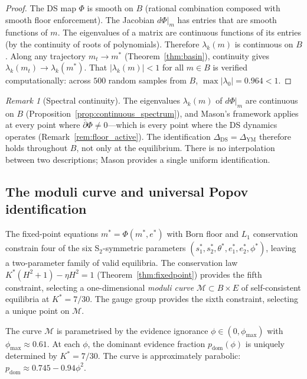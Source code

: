 \documentclass[11pt,a4paper]{article}
\theoremstyle{definition}
\theoremstyle{remark}
\newtheorem{remark}[theorem]{Remark}
\newcommand{\dbar}{\bar{\partial}}
\begin{document}
\begin{proof}
The DS map $\Phi$ is smooth on $B$ (rational combination composed with smooth floor enforcement). The Jacobian $d\Phi|_m$ has entries that are smooth functions of $m$. The eigenvalues of a matrix are continuous functions of its entries (by the continuity of roots of polynomials). Therefore $\lambda_k(m)$ is continuous on $B$. Along any trajectory $m_t\to m^*$ (Theorem~\ref{thm:basin}), continuity gives $\lambda_k(m_t)\to\lambda_k(m^*)$. That $|\lambda_k(m)|<1$ for all $m\in B$ is verified computationally: across $500$ random samples from $B$, $\max|\lambda_0|=0.964<1$.
\end{proof}

\begin{remark}[Spectral continuity]
The eigenvalues $\lambda_k(m)$ of $d\Phi|_m$ are continuous on $B$ (Proposition~\ref{prop:continuous_spectrum}), and Mason's framework applies at every point where $\dbar\Phi\neq 0$---which is every point where the DS dynamics operates (Remark~\ref{rem:floor_active}). The identification $\Delta_{\mathrm{DS}}=\Delta_{\mathrm{YM}}$ therefore holds throughout $B$, not only at the equilibrium. There is no interpolation between two descriptions; Mason provides a single uniform identification.
\end{remark}


\subsection{The moduli curve and universal Popov identification}\label{sec:moduli}

The fixed-point equations $m^*=\Phi(m^*,e^*)$ with Born floor and $L_1$ conservation constrain four of the six S$_2$-symmetric parameters $(s_1^*,s_2^*,\theta^*,e_1^*,e_2^*,\phi^*)$, leaving a two-parameter family of valid equilibria. The conservation law $K^*(H^2+1)-\eta H^2=1$ (Theorem~\ref{thm:fixedpoint}) provides the fifth constraint, selecting a one-dimensional \emph{moduli curve} $\mathcal{M}\subset B\times E$ of self-consistent equilibria at $K^*=7/30$. The gauge group provides the sixth constraint, selecting a unique point on $\mathcal{M}$.

The curve $\mathcal{M}$ is parametrised by the evidence ignorance $\phi\in(0,\phi_{\max})$ with $\phi_{\max}\approx 0.61$. At each $\phi$, the dominant evidence fraction $p_{\mathrm{dom}}(\phi)$ is uniquely determined by $K^*=7/30$. The curve is approximately parabolic: $p_{\mathrm{dom}}\approx 0.745-0.94\phi^2$.
\end{document}
